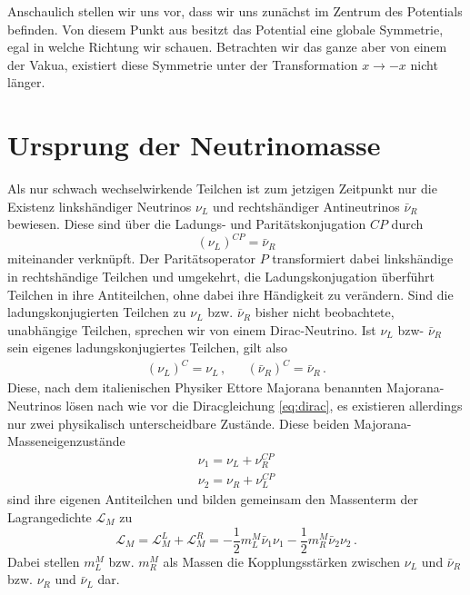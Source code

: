Anschaulich stellen wir uns vor, dass wir uns zunächst im Zentrum des Potentials befinden.
Von diesem Punkt aus besitzt das Potential eine globale Symmetrie, egal in welche Richtung wir schauen.
Betrachten wir das ganze aber von einem der Vakua, existiert diese Symmetrie unter der Transformation $x \rightarrow -x$ nicht länger.

\section{Ursprung der Neutrinomasse} %
\label{sec:neutrinomasse}

Als nur schwach wechselwirkende Teilchen ist zum jetzigen Zeitpunkt nur die Existenz linkshändiger Neutrinos $\nu_L$ und rechtshändiger Antineutrinos $\bar{\nu}_R$ bewiesen.
Diese sind über die Ladungs- und Paritätskonjugation $C P$ durch 
\begin{equation}
    (\nu_L)^{C P} = \bar{\nu}_R
    \label{eq:cpkonju}
\end{equation}
miteinander verknüpft.
Der Paritätsoperator $P$ transformiert dabei linkshändige in rechtshändige Teilchen und umgekehrt, die Ladungskonjugation überführt Teilchen in ihre Antiteilchen, ohne dabei ihre Händigkeit zu verändern.
Sind die ladungskonjugierten Teilchen zu $\nu_L$ bzw. $\bar{\nu}_R$ bisher nicht beobachtete, unabhängige Teilchen, sprechen wir von einem Dirac-Neutrino.
Ist $\nu_L$ bzw- $\bar{\nu}_R$ sein eigenes ladungskonjugiertes Teilchen, gilt also
\begin{align*}
    (\nu_L)^C = \nu_L \,, && (\bar{\nu}_R)^C = \bar{\nu}_R \,.
\end{align*}
Diese, nach dem italienischen Physiker Ettore Majorana benannten Majorana-Neutrinos lösen nach wie vor die Diracgleichung \eqref{eq:dirac}, es existieren allerdings nur zwei physikalisch unterscheidbare Zustände.
Diese beiden Majorana-Masseneigenzustände
\begin{align*}
    \nu_1 = \nu_L + \nu^{C P}_R \\
    \nu_2 = \nu_R + \nu^{C P}_L
\end{align*}
sind ihre eigenen Antiteilchen und bilden gemeinsam den Massenterm der Lagrangedichte $\mathcal{L}_M$ zu
\begin{equation}
    \mathcal{L}_M = \mathcal{L}^L_M + \mathcal{L}^R_M = -\frac{1}{2} m^M_L \bar{\nu}_1 \nu_1 - \frac{1}{2} m^M_R \bar{\nu}_2 \nu_2 \,.
    \label{eq:lagrangedichtemajo}
\end{equation}
Dabei stellen $m^M_L$ bzw. $m^M_R$ als Massen die Kopplungsstärken zwischen $\nu_L$ und $\bar{\nu}_R$ bzw. $\nu_R$ und $\bar{\nu}_L$ dar.


